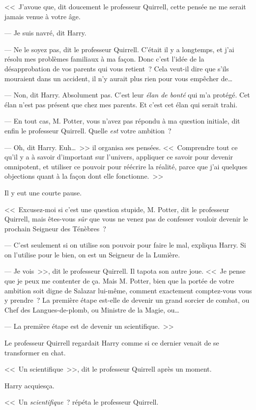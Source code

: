 <<~J'avoue que, dit doucement le professeur Quirrell, cette pensée ne me serait jamais venue à votre âge.

--- Je suis navré, dit Harry.

--- Ne le soyez pas, dit le professeur Quirrell. C'était il y a longtemps, et j'ai résolu mes problèmes familiaux à ma façon. Donc c'est l'idée de la désapprobation de vos parents qui vous retient~? Cela veut-il dire que s'ils mouraient dans un accident, il n'y aurait plus rien pour vous empêcher de…

--- Non, dit Harry. Absolument pas. C'est leur \emph{élan de bonté} qui m'a protégé. Cet élan n'est pas présent que chez mes parents. Et c'est cet élan qui serait trahi.

--- En tout cas, M. Potter, vous n'avez pas répondu à ma question initiale, dit enfin le professeur Quirrell. Quelle \emph{est} votre ambition~?

--- Oh, dit Harry. Euh…~>> il organisa ses pensées. <<~Comprendre tout ce qu'il y a à savoir d'important sur l'univers, appliquer ce savoir pour devenir omnipotent, et utiliser ce pouvoir pour réécrire la réalité, parce que j'ai quelques objections quant à la façon dont elle fonctionne.~>>

Il y eut une courte pause.

<<~Excusez-moi si c'est une question stupide, M. Potter, dit le professeur Quirrell, mais êtes-vous \emph{sûr} que vous ne venez pas de confesser vouloir devenir le prochain Seigneur des Ténèbres~?

--- C'est seulement si on utilise son pouvoir pour faire le mal, expliqua Harry. Si on l'utilise pour le bien, on est un Seigneur de la Lumière.

--- Je vois~>>, dit le professeur Quirrell. Il tapota son autre joue. <<~Je pense que je peux me contenter de ça. Mais M. Potter, bien que la portée de votre ambition soit digne de Salazar lui-même, comment exactement comptez-vous vous y prendre~? La première étape est-elle de devenir un grand sorcier de combat, ou Chef des Langues-de-plomb, ou Ministre de la Magie, ou…

--- La première étape est de devenir un scientifique.~>>

Le professeur Quirrell regardait Harry comme si ce dernier venait de se transformer en chat.

<<~Un scientifique~>>, dit le professeur Quirrell après un moment.

Harry acquiesça.

<<~Un \emph{scientifique}~? répéta le professeur Quirrell.

